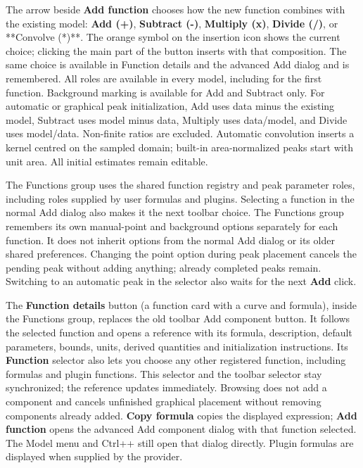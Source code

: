 \documentclass[
  10pt,
  a4paper,
  oneside]{scrreprt}
\begin{document}
The arrow beside \textbf{Add function} chooses how the new function
combines with the existing model: \textbf{Add (+)}, \textbf{Subtract
(-)}, \textbf{Multiply (x)}, \textbf{Divide (/)}, or **Convolve (*)**.
The orange symbol on the insertion icon shows the current choice;
clicking the main part of the button inserts with that composition. The
same choice is available in Function details and the advanced Add dialog
and is remembered. All roles are available in every model, including for
the first function. Background marking is available for Add and Subtract
only. For automatic or graphical peak initialization, Add uses data
minus the existing model, Subtract uses model minus data, Multiply uses
data/model, and Divide uses model/data. Non-finite ratios are excluded.
Automatic convolution inserts a kernel centred on the sampled domain;
built-in area-normalized peaks start with unit area. All initial
estimates remain editable.

The Functions group uses the shared function registry and peak parameter
roles, including roles supplied by user formulas and plugins. Selecting
a function in the normal Add dialog also makes it the next toolbar
choice. The Functions group remembers its own manual-point and
background options separately for each function. It does not inherit
options from the normal Add dialog or its older shared preferences.
Changing the point option during peak placement cancels the pending peak
without adding anything; already completed peaks remain. Switching to an
automatic peak in the selector also waits for the next \textbf{Add}
click.

The \textbf{Function details} button (a function card with a curve and
formula), inside the Functions group, replaces the old toolbar Add
component button. It follows the selected function and opens a reference
with its formula, description, default parameters, bounds, units,
derived quantities and initialization instructions. Its
\textbf{Function} selector also lets you choose any other registered
function, including formulas and plugin functions. This selector and the
toolbar selector stay synchronized; the reference updates immediately.
Browsing does not add a component and cancels unfinished graphical
placement without removing components already added. \textbf{Copy
formula} copies the displayed expression; \textbf{Add function} opens
the advanced Add component dialog with that function selected. The Model
menu and Ctrl++ still open that dialog directly. Plugin formulas are
displayed when supplied by the provider.
\end{document}
